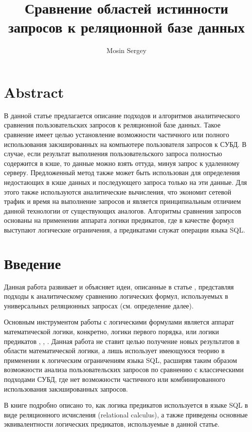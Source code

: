 \documentclass[10pt,a4paper]{article}
\author{Mosin Sergey}
\title{Сравнение областей истинности запросов к реляционной базе данных}
\begin{document}
\maketitle

\section{Abstract}
В данной статье предлагается описание подходов и алгоритмов аналитического сравнения пользовательских
запросов к реляционной базе данных. Такое сравнение имеет целью установление возможности частичного или
полного использования закэшированных на компьютере пользователя запросов к СУБД. В случае, если результат
выполнения пользовательского запроса полностью содержится в кэше, то данные можно взять оттуда, минуя
запрос к удаленному серверу. Предложенный метод также может быть использован для определения недостающих в
кэше данных и последующего запроса только на эти данные. Для этого также используются аналитические
вычисления, что экономит сетевой трафик и время на выполнение запросов и является принципиальным отличием
данной технологии от существующих аналогов. Алгоритмы сравнения запросов основаны на применении аппарата
логики предикатов, где в качестве формул выступают логические ограничения, а предикатами служат операции
языка SQL.


\section*{Введение}
Данная работа развивает и объясняет идеи, описанные в статье \cite{mosin_zykin}, представляя подходы к аналитическому сравнению логических формул, используемых в универсальных реляционных запросах (см. определение далее).

Основным инструментом работы с логическими формулами является аппарат математической логики, конкретно, логики первого порядка, или логики предикатов \cite{gilbert}, \cite{mendelson}, \cite{church}. Данная работа не ставит целью получение новых результатов в области математической логики, а лишь использует имеющуюся теорию в применении к логическим ограничениям языка SQL, расширяя таким образом возможности анализа пользовательских запросов по сравнению с классическими подходами СУБД, где нет возможности частичного или комбинированного использования закэшированных запросов.

В книге \cite{date} подробно описано то, как логика предикатов используется в языке SQL в виде реляционного исчисления (relational calculus), а также приведены основные эквивалентности логических предикатов, используемые в данной статье.
\end{document}
